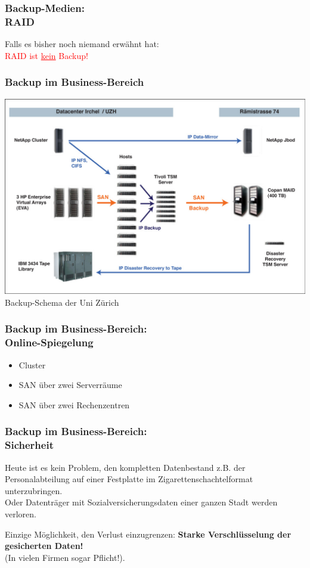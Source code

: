 \begin{frame}
  \frametitle{Backup-Medien:\\RAID}
  \begin{center}
    Falls es bisher noch niemand erwähnt hat:\\
    \pause
    \vspace{10mm}
    \textcolor{red}{{\Huge RAID ist \underline{kein} Backup!}}
  \end{center}
\end{frame}

\begin{frame}
  \frametitle{Backup im Business-Bereich}
  \includegraphics[width=0.9\linewidth]{Bilder/UniZuerichBackup}
  Backup-Schema der Uni Zürich
\end{frame}

\begin{frame}
  \frametitle{Backup im Business-Bereich:\\Online-Spiegelung}
  \pause
  \begin{itemize}
    \item Cluster
    \item SAN über zwei Serverräume
    \item SAN über zwei Rechenzentren
  \end{itemize}
\end{frame}

\begin{frame}
  \frametitle{Backup im Business-Bereich:\\Sicherheit}
  \pause
  Heute ist es kein Problem, den kompletten Datenbestand z.B. der Personalabteilung auf einer Festplatte im Zigarettenschachtelformat unterzubringen.\\
  \pause
  Oder Datenträger mit Sozialversicherungsdaten einer ganzen Stadt werden verloren.\\
  \pause
  \begin{alertblock}{Einzige Möglichkeit, den Verlust einzugrenzen:}
      {\bf Starke Verschlüsselung der gesicherten Daten!}\\(In vielen Firmen sogar Pflicht!).
    \end{alertblock}
\end{frame}

